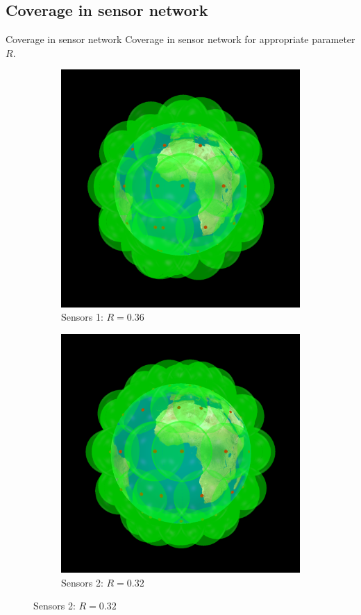 \documentclass{beamer}
\begin{document}
\subsection{Coverage in sensor network}
\begin{frame}{Coverage in sensor network}
Coverage in sensor network for appropriate parameter $R$.
\begin{figure}[!ht]
\centering
\begin{subfigure}{.5\textwidth}
\centering
\includegraphics[scale=0.15]{used_images/coverage01}
\caption{Sensors 1: $R = 0.36$}
\end{subfigure}%
\begin{subfigure}{.5\textwidth}
\centering
\includegraphics[scale=0.15]{used_images/coverage02}
\caption{Sensors 2: $R = 0.32$}
\end{subfigure}%


\end{figure}
\end{frame}
\end{document}
